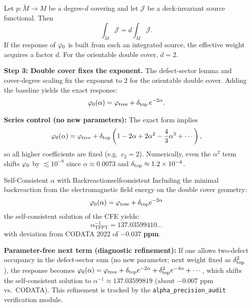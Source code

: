\begin{tcolorbox}[colback=blue!3, colframe=blue!40, 
    title={\textbf{Lemma (Cover-Degree Scaling of Deck-Invariant Response)}}, fonttitle=\bfseries\small]
Let $p:\widetilde{M}\to M$ be a degree-$d$ covering and let $\mathcal{J}$ be a deck-invariant
source functional. Then
\begin{equation}
    \int_{\widetilde{M}}\mathcal{J} = d \int_{M}\mathcal{J}.
\end{equation}
If the response of $\varphi_0$ is built from such an integrated source, the effective
weight acquires a factor $d$. For the orientable double cover, $d=2$.
\end{tcolorbox}

\textbf{Step 3: Double cover fixes the exponent.}
The defect-sector lemma and cover-degree scaling fix the exponent to $2$ for the
orientable double cover. Adding the baseline yields the exact response:
\begin{equation}
    \varphi_0(\alpha) = \varphi_{\mathrm{tree}} + \delta_{\mathrm{top}}\,e^{-2\alpha}.
\end{equation}

\begin{remark}
\textbf{Series control (no new parameters):} The exact form implies
\begin{equation}
    \varphi_0(\alpha)=\varphi_{\mathrm{tree}}+\delta_{\mathrm{top}}\left(1-2\alpha+2\alpha^2-\frac{4}{3}\alpha^3+\cdots\right),
\end{equation}
so all higher coefficients are fixed (e.g.\ $c_2=2$). Numerically, even the
$\alpha^2$ term shifts $\varphi_0$ by $\lesssim 10^{-8}$ since
$\alpha\approx 0.0073$ and $\delta_{\mathrm{top}}\approx 1.2\times10^{-4}$.
\end{remark}

\begin{theorem}{Self-Consistent $\alpha$ with Backreaction}{selfconsistent}
Including the minimal backreaction from the electromagnetic field energy 
on the double cover geometry:
\begin{equation}
    \varphi_0(\alpha) = \varphi_{\mathrm{tree}} + \delta_{\mathrm{top}} e^{-2\alpha}
    \label{eq:backreaction}
\end{equation}
the self-consistent solution of the CFE yields:
\begin{equation}
    \boxed{\alpha^{-1}_{\text{TFPT}} = 137.03599410\ldots}
\end{equation}
with deviation from CODATA 2022 of $\mathbf{-0.037}$ \textbf{ppm}.
\end{theorem}

\begin{remark}
\textbf{Parameter-free next term (diagnostic refinement):}
If one allows two-defect occupancy in the defect-sector sum (no new parameter; next weight fixed as $\delta_{\mathrm{top}}^2$),
the response becomes
\(\varphi_0(\alpha)=\varphi_{\mathrm{tree}}+\delta_{\mathrm{top}} e^{-2\alpha}+\delta_{\mathrm{top}}^2 e^{-4\alpha}+\cdots\),
which shifts the self-consistent solution to
\(\alpha^{-1}\approx 137.03599819\) (about $-0.007$ ppm vs.\ CODATA).
This refinement is tracked by the \texttt{alpha\_precision\_audit} verification module.
\end{remark}

